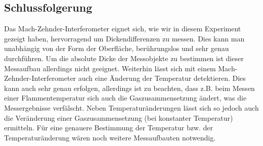 \subsection{Schlussfolgerung}
Das Mach-Zehnder-Interferometer eignet sich, wie wir in diesem Experiment gezeigt haben, hervorragend um Dickendifferenzen zu messen. Dies kann man unabhängig von der Form der Oberfläche, berührungslos und sehr genau durchführen. Um die absolute Dicke der Messobjekte zu bestimmen ist dieser Messaufbau allerdings nicht geeignet.
Weiterhin lässt sich mit einem Mach-Zehnder-Interferometer auch eine Änderung der Temperatur detektieren. Dies kann auch sehr genau erfolgen, allerdings ist zu beachten, dass z.B. beim Messen einer Flammentemperatur sich auch die Gaszusammensetzung ändert, was die Messergebnisse verfälscht. 
Neben Temperaturänderungen lässt sich so jedoch auch die Veränderung einer Gaszusammensetzung (bei konstanter Temperatur) ermitteln. Für eine genauere Bestimmung der Temperatur bzw. der Temperaturänderung wären noch weitere Messaufbauten notwendig.  


